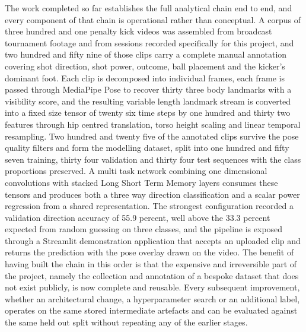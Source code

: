 The work completed so far establishes the full analytical chain end to end, and every component of that chain is operational rather than conceptual. A corpus of three hundred and one penalty kick videos was assembled from broadcast tournament footage and from sessions recorded specifically for this project, and two hundred and fifty nine of those clips carry a complete manual annotation covering shot direction, shot power, outcome, ball placement and the kicker's dominant foot. Each clip is decomposed into individual frames, each frame is passed through MediaPipe Pose to recover thirty three body landmarks with a visibility score, and the resulting variable length landmark stream is converted into a fixed size tensor of twenty six time steps by one hundred and thirty two features through hip centred translation, torso height scaling and linear temporal resampling. Two hundred and twenty five of the annotated clips survive the pose quality filters and form the modelling dataset, split into one hundred and fifty seven training, thirty four validation and thirty four test sequences with the class proportions preserved. A multi task network combining one dimensional convolutions with stacked Long Short Term Memory layers consumes these tensors and produces both a three way direction classification and a scalar power regression from a shared representation. The strongest configuration recorded a validation direction accuracy of 55.9 percent, well above the 33.3 percent expected from random guessing on three classes, and the pipeline is exposed through a Streamlit demonstration application that accepts an uploaded clip and returns the prediction with the pose overlay drawn on the video. The benefit of having built the chain in this order is that the expensive and irreversible part of the project, namely the collection and annotation of a bespoke dataset that does not exist publicly, is now complete and reusable. Every subsequent improvement, whether an architectural change, a hyperparameter search or an additional label, operates on the same stored intermediate artefacts and can be evaluated against the same held out split without repeating any of the earlier stages.

